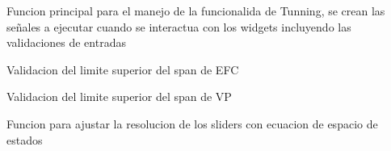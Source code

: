 \documentclass[letterpaper,10pt,spanish]{sphinxmanual}
\begin{document}

\begin{fulllineitems}
\label{\detokenize{codigos/TuningHandler:TuningHandler.TuningHandler}}
Funcion principal para el manejo de la funcionalida de Tunning, se crean las señales a ejecutar cuando se interactua con los widgets incluyendo las validaciones de entradas

\end{fulllineitems}


\begin{fulllineitems}
\label{\detokenize{codigos/TuningHandler:TuningHandler.UEFC_validator}}
Validacion del limite superior del span de EFC

\end{fulllineitems}


\begin{fulllineitems}
\label{\detokenize{codigos/TuningHandler:TuningHandler.UVP_validator}}
Validacion del limite superior del span de VP

\end{fulllineitems}


\begin{fulllineitems}
\label{\detokenize{codigos/TuningHandler:TuningHandler.actualizar_sliders_ss}}
Funcion para ajustar la resolucion de los sliders con ecuacion de espacio de estados

\end{fulllineitems}
\end{document}
